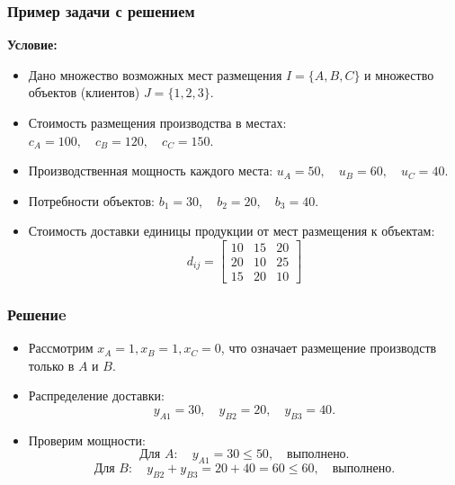 \documentclass[12pt]{beamer}
\begin{document}
    \begin{frame}
        \frametitle{Пример задачи с решением}
    
        \textbf{Условие:}
        \begin{itemize}
            \item Дано множество возможных мест размещения \( I = \{A, B, C\} \) и множество объектов (клиентов) \( J = \{1, 2, 3\} \).
            \item Стоимость размещения производства в местах: $c_A = 100, \quad c_B = 120, \quad c_C = 150.$
            \item Производственная мощность каждого места: $u_A = 50, \quad u_B = 60, \quad u_C = 40.$
            \item Потребности объектов: $b_1 = 30, \quad b_2 = 20, \quad b_3 = 40.$
            \item Стоимость доставки единицы продукции от мест размещения к объектам:
            \[
            d_{ij} = 
            \begin{bmatrix}
            10 & 15 & 20 \\
            20 & 10 & 25 \\
            15 & 20 & 10
            \end{bmatrix}
            \]
        \end{itemize}
    
    \end{frame}

    \begin{frame}
        \frametitle{Решениe}
    
        \begin{itemize}
            \item Рассмотрим \( x_A = 1, x_B = 1, x_C = 0 \), что означает размещение производств только в \( A \) и \( B \).
            \item Распределение доставки:
            \[
            y_{A1} = 30, \quad y_{B2} = 20, \quad y_{B3} = 40.
            \]
            \item Проверим мощности:
            \[
            \text{Для } A: \quad y_{A1} = 30 \leq 50, \quad \text{выполнено.}
            \]
            \[
            \text{Для } B: \quad y_{B2} + y_{B3} = 20 + 40 = 60 \leq 60, \quad \text{выполнено.}
            \]
        \end{itemize}
    
    \end{frame}
\end{document}
